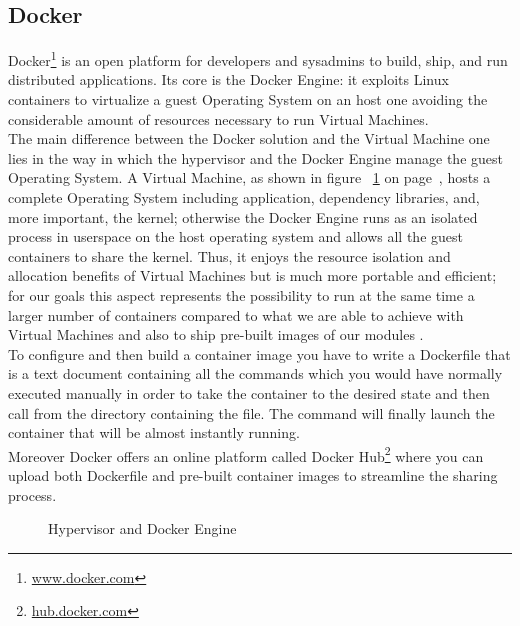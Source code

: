 
\subsection{Docker}
\label{sub:sota_docker}
Docker\footnote{\url{www.docker.com}} is an open platform for developers and sysadmins to build, ship, and run distributed applications. Its core is the Docker Engine: it exploits Linux containers to virtualize a guest Operating System on an host one avoiding the considerable amount of resources necessary to run Virtual Machines.\\
The main difference between the Docker solution and the Virtual Machine one lies in the way in which the hypervisor and the Docker Engine manage the guest Operating System. A Virtual Machine, as shown in figure ~\ref{fig:docker_vm} on page~\pageref{fig:docker_vm}, hosts a complete Operating System including application, dependency libraries, and, more important, the kernel; otherwise the Docker Engine runs as an isolated process in userspace on the host operating system and allows all the guest containers to share the kernel. Thus, it enjoys the resource isolation and allocation benefits of Virtual Machines but is much more portable and efficient; for our goals this aspect represents the possibility to run at the same time a larger number of containers compared to what we are able to achieve with Virtual Machines and also to ship pre-built images of our modules .\\
To configure and then build a container image you have to write a Dockerfile that is a text document containing all the commands which you would have normally executed manually in order to take the container to the desired state and then call  from the directory containing the file. The command  will finally launch the container that will be almost instantly running.\\
Moreover Docker offers an online platform called Docker Hub\footnote{\url{hub.docker.com}} where you can upload both Dockerfile and pre-built container images to streamline the sharing process.
    
\begin{figure}[!ht]
\label{fig:docker_vm}
\caption{Hypervisor and Docker Engine}
\end{figure}

